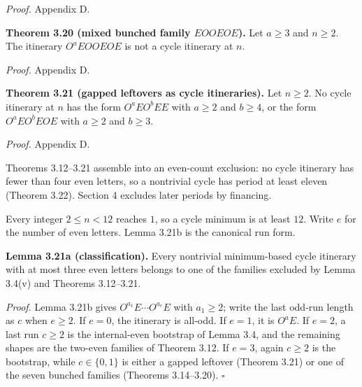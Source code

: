\documentclass[12pt]{article}
\begin{document}
\emph{Proof.} Appendix D.

\textbf{Theorem 3.20 (mixed bunched family \(EOOEOE\)).} Let \(a\ge 3\)
and \(n\ge 2\). The itinerary \(O^aEOOEOE\) is not a cycle itinerary at
\(n\).

\emph{Proof.} Appendix D.

\textbf{Theorem 3.21 (gapped leftovers as cycle itineraries).} Let
\(n\ge 2\). No cycle itinerary at \(n\) has the form \(O^aEO^bEE\) with
\(a\ge 2\) and \(b\ge 4\), or the form \(O^aEO^bEOE\) with \(a\ge 2\)
and \(b\ge 3\).

\emph{Proof.} Appendix D.

Theorems 3.12--3.21 assemble into an even-count exclusion: no cycle
itinerary has fewer than four even letters, so a nontrivial cycle has
period at least eleven (Theorem 3.22). Section 4 excludes later periods
by financing.

Every integer \(2\le n<12\) reaches \(1\), so a cycle minimum is at
least \(12\). Write \(e\) for the number of even letters. Lemma 3.21b is
the canonical run form.

\textbf{Lemma 3.21a (classification).} Every nontrivial minimum-based
cycle itinerary with at most three even letters belongs to one of the
families excluded by Lemma 3.4(v) and Theorems 3.12--3.21.

\emph{Proof.} Lemma 3.21b gives \(O^{a_1}E\cdots O^{a_e}E\) with
\(a_1\ge2\); write the last odd-run length as \(c\) when \(e\ge2\). If
\(e=0\), the itinerary is all-odd. If \(e=1\), it is \(O^aE\). If
\(e=2\), a last run \(c\ge 2\) is the internal-even bootstrap of Lemma
3.4, and the remaining shapes are the two-even families of Theorem 3.12.
If \(e=3\), again \(c\ge 2\) is the bootstrap, while \(c\in\{0,1\}\) is
either a gapped leftover (Theorem 3.21) or one of the seven bunched
families (Theorems 3.14--3.20). \(\square\)

\begingroup\small
\end{document}
